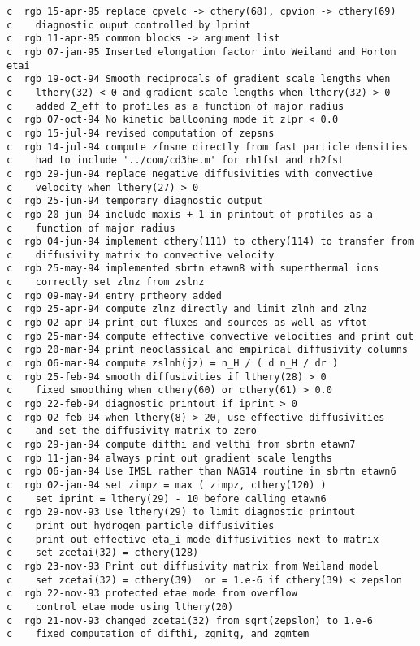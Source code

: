 \begin{verbatim}
c  rgb 15-apr-95 replace cpvelc -> cthery(68), cpvion -> cthery(69)
c    diagnostic ouput controlled by lprint
c  rgb 11-apr-95 common blocks -> argument list
c  rgb 07-jan-95 Inserted elongation factor into Weiland and Horton etai
c  rgb 19-oct-94 Smooth reciprocals of gradient scale lengths when 
c    lthery(32) < 0 and gradient scale lengths when lthery(32) > 0
c    added Z_eff to profiles as a function of major radius
c  rgb 07-oct-94 No kinetic ballooning mode it zlpr < 0.0
c  rgb 15-jul-94 revised computation of zepsns
c  rgb 14-jul-94 compute zfnsne directly from fast particle densities
c    had to include '../com/cd3he.m' for rh1fst and rh2fst
c  rgb 29-jun-94 replace negative diffusivities with convective
c    velocity when lthery(27) > 0
c  rgb 25-jun-94 temporary diagnostic output
c  rgb 20-jun-94 include maxis + 1 in printout of profiles as a 
c    function of major radius
c  rgb 04-jun-94 implement cthery(111) to cthery(114) to transfer from
c    diffusivity matrix to convective velocity
c  rgb 25-may-94 implemented sbrtn etawn8 with superthermal ions
c    correctly set zlnz from zslnz
c  rgb 09-may-94 entry prtheory added
c  rgb 25-apr-94 compute zlnz directly and limit zlnh and zlnz
c  rgb 02-apr-94 print out fluxes and sources as well as vftot
c  rgb 25-mar-94 compute effective convective velocities and print out
c  rgb 20-mar-94 print neoclassical and empirical diffusivity columns
c  rgb 06-mar-94 compute zslnh(jz) = n_H / ( d n_H / dr )
c  rgb 25-feb-94 smooth diffusivities if lthery(28) > 0
c    fixed smoothing when cthery(60) or cthery(61) > 0.0
c  rgb 22-feb-94 diagnostic printout if iprint > 0
c  rgb 02-feb-94 when lthery(8) > 20, use effective diffusivities
c    and set the diffusivity matrix to zero
c  rgb 29-jan-94 compute difthi and velthi from sbrtn etawn7
c  rgb 11-jan-94 always print out gradient scale lengths
c  rgb 06-jan-94 Use IMSL rather than NAG14 routine in sbrtn etawn6
c  rgb 02-jan-94 set zimpz = max ( zimpz, cthery(120) )
c    set iprint = lthery(29) - 10 before calling etawn6
c  rgb 29-nov-93 Use lthery(29) to limit diagnostic printout
c    print out hydrogen particle diffusivities
c    print out effective eta_i mode diffusivities next to matrix
c    set zcetai(32) = cthery(128)
c  rgb 23-nov-93 Print out diffusivity matrix from Weiland model
c    set zcetai(32) = cthery(39)  or = 1.e-6 if cthery(39) < zepslon
c  rgb 22-nov-93 protected etae mode from overflow 
c    control etae mode using lthery(20)
c  rgb 21-nov-93 changed zcetai(32) from sqrt(zepslon) to 1.e-6
c    fixed computation of difthi, zgmitg, and zgmtem

\end{verbatim}
